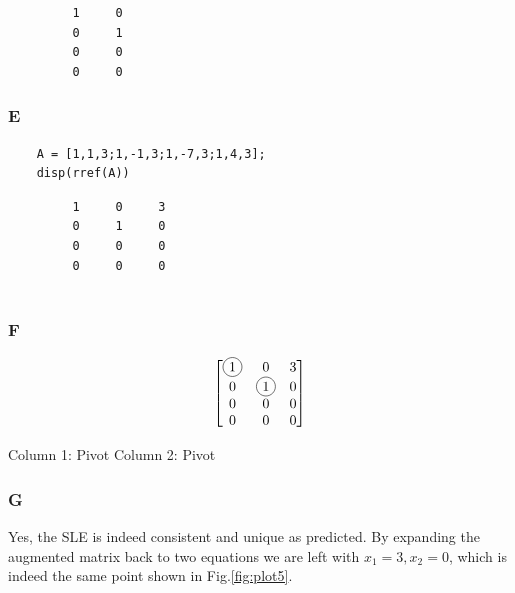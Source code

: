 \documentclass{article}
\begin{document}
\color{lightgray}
\begin{verbatim}
         1     0
         0     1
         0     0
         0     0
\end{verbatim}
\color{black}


\subsubsection*{E}

\begin{verbatim}
    A = [1,1,3;1,-1,3;1,-7,3;1,4,3];
    disp(rref(A))
\end{verbatim}

\color{lightgray}
\begin{verbatim}
         1     0     3
         0     1     0
         0     0     0
         0     0     0
    
\end{verbatim}
\color{black}

\subsubsection*{F}

\[
	\begin{bmatrix}
		\tikz[baseline=(char.base)] \node[draw,circle,inner sep=2pt] (char) {1}; & 0                                                                        & 3 \\
		0                                                                        & \tikz[baseline=(char.base)] \node[draw,circle,inner sep=2pt] (char) {1}; & 0 \\
		0                                                                        & 0                                                                        & 0 \\
		0                                                                        & 0                                                                        & 0
	\end{bmatrix}
\]

Column 1: Pivot
Column 2: Pivot

\subsubsection*{G}

Yes, the SLE is indeed consistent and unique as predicted. By expanding the augmented matrix back to two equations we are left with $x_1 = 3, x_2 = 0$, which is indeed the same point shown in Fig.\ref{fig:plot5}.
\end{document}
